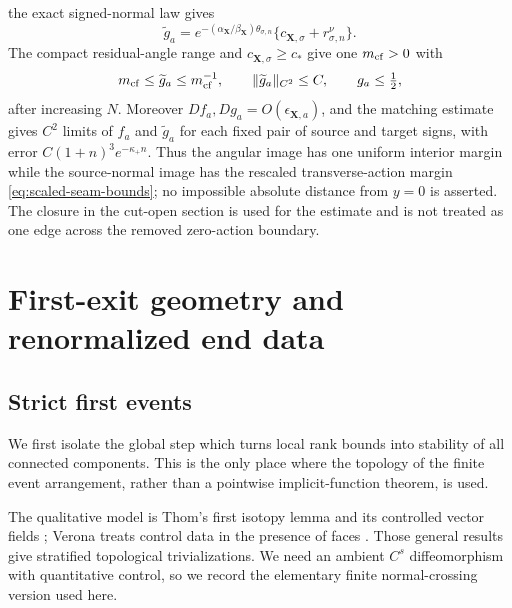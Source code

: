 \documentclass[11pt]{amsart}
\numberwithin{equation}{section}
\theoremstyle{definition}
\theoremstyle{remark}
\begin{document}
the exact signed-normal law gives
\begin{equation}\label{eq:scaled-seam-formula}
 \widetilde g_a
 =e^{-(\alpha_{\mathbf X}/\beta_{\mathbf X})
          \theta_{\sigma,n}}
   \{c_{\mathbf X,\sigma}+r^\nu_{\sigma,n}\}.
\end{equation}
The compact residual-angle range and $c_{\mathbf X,\sigma}\ge c_*$ give
one $m_{\rm cf}>0$ with
\begin{equation}\label{eq:scaled-seam-bounds}
 m_{\rm cf}\le\widetilde g_a\le m_{\rm cf}^{-1},\qquad
 \|\widetilde g_a\|_{C^2}\le C,\qquad g_a\le\tfrac12,
\end{equation}
after increasing $N$.  Moreover $Df_a,Dg_a=O(\epsilon_{\mathbf X,a})$,
and the matching estimate gives $C^2$ limits of $f_a$ and
$\widetilde g_a$ for each fixed pair of source and target signs, with error
$C(1+n)^3e^{-\kappa_+n}$.  Thus the angular image has one uniform interior
margin while the source-normal image has the rescaled transverse-action
margin
\eqref{eq:scaled-seam-bounds}; no impossible absolute distance from
$y=0$ is asserted.  The closure in the cut-open section is used for the
estimate and is not treated as one edge across the removed zero-action
boundary.

\section{First-exit geometry and renormalized end data}
\label{sec:terminal}

\subsection{Strict first events}

We first isolate the global step which turns local rank bounds into
stability of all connected components.  This is the only place where the topology of the finite
event arrangement, rather than a pointwise implicit-function theorem, is
used.

The qualitative model is Thom's first isotopy lemma and its controlled
vector fields \cite[Sections~7--11]{Mather2012Notes}; Verona treats control
data in the presence of faces \cite[pp.~9--20 and 29--57]{Verona1984Stratified}.
Those general results give stratified topological trivializations.  We need
an ambient $C^s$ diffeomorphism with quantitative control, so we record the
elementary finite normal-crossing version used here.
\end{document}
